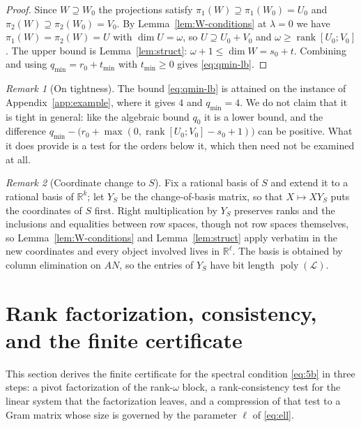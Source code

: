 \documentclass[journal]{IEEEtran}
\theoremstyle{plainn}
\theoremstyle{remark}
\newtheorem{remark}{Remark}
\begin{document}
\begin{proof}
Since $W\supseteq W_0$ the projections satisfy $\pi_1(W)\supseteq\pi_1(W_0)=U_0$ and
$\pi_2(W)\supseteq\pi_2(W_0)=V_0$. By Lemma~\ref{lem:W-conditions} at $\lambda=0$ we have
$\pi_1(W)=\pi_2(W)=U$ with $\dim U=\omega$, so $U\supseteq U_0+V_0$ and
$\omega\ge\operatorname{rank}[U_0;V_0]$. The upper bound is Lemma~\ref{lem:struct}:
$\omega+1\le\dim W=s_0+t$. Combining and using $q_{\min}=r_0+t_{\min}$ with $t_{\min}\ge0$ gives
\eqref{eq:qmin-lb}.
\end{proof}

\begin{remark}[On tightness]\label{rem:lbtight}
The bound \eqref{eq:qmin-lb} is attained on the instance of Appendix~\ref{app:example}, where it gives
$4$ and $q_{\min}=4$. We do not claim that it is tight in general: like the algebraic bound $q_0$ it is
a lower bound, and the difference
$q_{\min}-\bigl(r_0+\max(0,\operatorname{rank}[U_0;V_0]-s_0+1)\bigr)$ can be positive. What it does
provide is a test for the orders below it, which then need not be examined at all.
\end{remark}

\begin{remark}[Coordinate change to $S$]\label{rem:YS}
Fix a rational basis of $S$ and extend it to a rational basis of $\mathbb R^k$; let $Y_S$ be
the change-of-basis matrix, so that $X\mapsto XY_S$ puts the coordinates of $S$ first. Right
multiplication by $Y_S$ preserves ranks and the inclusions and equalities between row spaces,
though not row spaces themselves, so Lemma~\ref{lem:W-conditions} and
Lemma~\ref{lem:struct} apply verbatim in the new coordinates and every object involved lives
in $\mathbb R^\ell$. The basis is obtained by column elimination on $AN$, so the entries of
$Y_S$ have bit length $\operatorname{poly}(\mathcal L)$.
\end{remark}

\section{Rank factorization, consistency, and the finite certificate}\label{sec:certificate}

This section derives the finite certificate for the spectral condition
\eqref{eq:5b} in three steps: a pivot factorization of the rank-$\omega$
block, a rank-consistency test for the linear system that the factorization
leaves, and a compression of that test to a Gram matrix whose size is
governed by the parameter $\ell$ of \eqref{eq:ell}.
\end{document}
